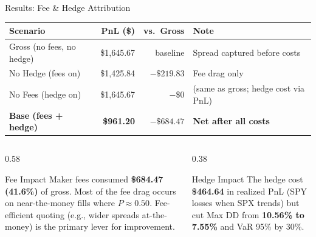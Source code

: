 \documentclass[aspectratio=169]{beamer}
\begin{document}
\begin{frame}{Results: Fee \& Hedge Attribution}
  \begin{center}
    \small
    \begin{tabular}{@{}lrrl@{}}
      \toprule
      \textbf{Scenario} & \textbf{PnL (\$)} & \textbf{vs.\ Gross} & \textbf{Note} \\
      \midrule
      Gross (no fees, no hedge) & \$1,645.67 & baseline   & Spread captured before costs \\
      No Hedge (fees on)        & \$1,425.84 & $-\$219.83$ & Fee drag only \\
      No Fees (hedge on)        & \$1,645.67 & $-\$0$      & (same as gross; hedge cost via PnL) \\
      \textbf{Base (fees + hedge)} & \textbf{\$961.20} & $-\$684.47$ & \textbf{Net after all costs} \\
      \bottomrule
    \end{tabular}
  \end{center}
  \vspace{0.6em}
  \begin{columns}[T]
    \begin{column}{0.58\textwidth}
      \begin{block}{Fee Impact}
        \small Maker fees consumed \textbf{\$684.47 (41.6\%)} of gross. Most of the fee drag
        occurs on near-the-money fills where $P \approx 0.50$.
        Fee-efficient quoting (e.g., wider spreads at-the-money) is the primary lever for improvement.
      \end{block}
    \end{column}
    \begin{column}{0.38\textwidth}
      \begin{block}{Hedge Impact}
        \small The hedge cost \textbf{\$464.64} in realized PnL (SPY losses when SPX trends)
        but cut Max DD from \textbf{10.56\% to 7.55\%} and VaR 95\% by 30\%.
      \end{block}
    \end{column}
  \end{columns}
\end{frame}
\end{document}
